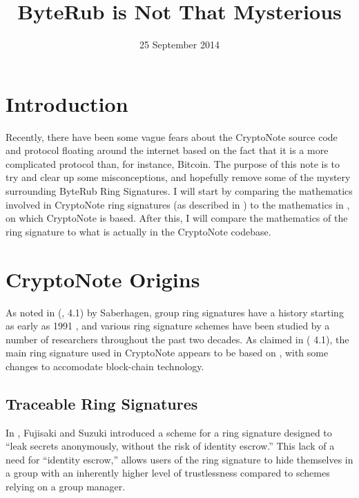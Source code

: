 \documentclass[12pt,english]{mrl}
\numberwithin{equation}{section}
\numberwithin{figure}{section}
\begin{document}
\begin{frontmatter}

\begin{fmbox}
\hfill\setlength{\fboxrule}{0px}\setlength{\fboxsep}{5px}
\title{ByteRub is Not That Mysterious}
\date{25 September 2014}
\author[
   addressref={mrl},
   email={lab@byterub.cc}
]{ }


\address[id=mrl]{
}
\end{fmbox}



\end{frontmatter}

\section{Introduction}
Recently, there have been some vague fears about the CryptoNote
source code and protocol floating around the internet based on the
fact that it is a more complicated protocol than, for instance, Bitcoin.
The purpose of this note is to try and clear up some misconceptions,
and hopefully remove some of the mystery surrounding ByteRub Ring Signatures.
I will start by comparing the mathematics involved in CryptoNote
ring signatures (as described in \cite{CN}) to the mathematics in
\cite{FS}, on which CryptoNote is based. After this, I will compare
the mathematics of the ring signature to what is actually in the
CryptoNote codebase. 


\section{CryptoNote Origins}

As noted in (\cite{CN}, 4.1) by Saberhagen, group ring signatures have a history
starting as early as 1991 \cite{CH}, and various ring signature
schemes have been studied by a number of researchers throughout the
past two decades. As claimed in (\cite{CN} 4.1), the main ring signature
used in CryptoNote appears to be based on \cite{FS}, with some changes
to accomodate block-chain technology. 


\subsection{Traceable Ring Signatures}

In \cite{FS}, Fujisaki and Suzuki introduced a scheme for a ring
signature designed to ``leak secrets anonymously, without the risk
of identity escrow.'' This lack of a need for ``identity escrow,''
allows users of the ring signature to hide themselves in a group with
an inherently higher level of trustlessness compared to schemes relying
on a group manager.
\end{document}
